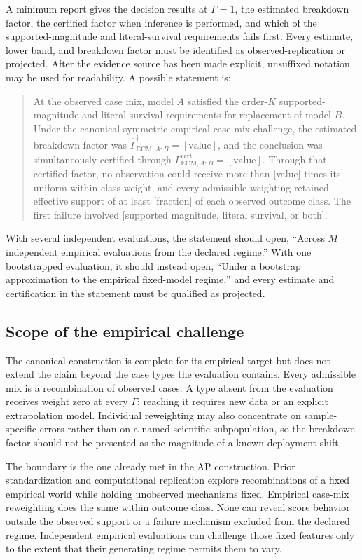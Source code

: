 \documentclass[11pt]{article}
\theoremstyle{remark}
\begin{document}
A minimum report gives the decision results at $\Gamma=1$, the estimated
breakdown factor, the certified factor when inference is performed, and which
of the supported-magnitude and literal-survival requirements fails first. Every
estimate, lower band, and breakdown factor must be identified as
observed-replication or projected. After the evidence source has been made
explicit, unsuffixed notation may be used for readability. A possible statement
is:
\begin{quote}
At the observed case mix, model $A$ satisfied the order-$K$ supported-magnitude
and literal-survival requirements for replacement of model $B$. Under the
canonical symmetric empirical case-mix challenge, the estimated breakdown
factor was $\widehat\Gamma_{\mathrm{ECM},A:B}^{\dagger}=[\text{value}]$, and
the conclusion was simultaneously certified through
$\Gamma_{\mathrm{ECM},A:B}^{\mathrm{cert}}=[\text{value}]$. Through that
certified factor, no observation could receive more than [value] times its
uniform within-class weight, and every admissible weighting retained effective
support of at least [fraction] of each observed outcome class. The first failure
involved [supported magnitude, literal survival, or both].
\end{quote}
With several independent evaluations, the statement should open, ``Across $M$
independent empirical evaluations from the declared regime.'' With one
bootstrapped evaluation, it should instead open, ``Under a bootstrap
approximation to the empirical fixed-model regime,'' and every estimate and
certification in the statement must be qualified as projected.

\subsection{Scope of the empirical challenge}

The canonical construction is complete for its empirical target but does not
extend the claim beyond the case types the evaluation contains. Every
admissible mix is a recombination of observed cases. A type absent from the
evaluation receives weight zero at every $\Gamma$; reaching it requires new
data or an explicit extrapolation model. Individual reweighting may also
concentrate on sample-specific errors rather than on a named scientific
subpopulation, so the breakdown factor should not be presented as the magnitude
of a known deployment shift.

The boundary is the one already met in the AP construction. Prior
standardization and computational replication explore recombinations of a
fixed empirical world while holding unobserved mechanisms fixed. Empirical
case-mix reweighting does the same within outcome class. None can reveal score
behavior outside the observed support or a failure mechanism excluded from the
declared regime. Independent empirical evaluations can challenge those fixed
features only to the extent that their generating regime permits them to vary.
\end{document}
